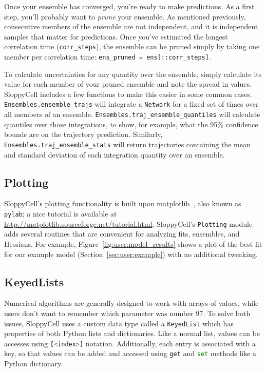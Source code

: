 \documentclass[12pt]{article}
\makeatletter
\newcommand{\py}[1]{\lstinline[language=Python, showstringspaces=False]@#1@}
\makeatother
\begin{document}
Once your ensemble has converged, you're ready to make predictions.
As a first step, you'll probably want to \emph{prune} your ensemble.
As mentioned previously, consecutive members of the ensemble are not independent, and it is independent samples that matter for predictions.
Once you've estimated the longest correlation time (\py{corr_steps}), the ensemble can be pruned simply by taking one member per correlation time: \py{ens_pruned = ens[::corr_steps]}.

To calculate uncertainties for any quantity over the ensemble, simply calculate its value for each member of your pruned ensemble and note the spread in values.
SloppyCell includes a few functions to make this easier in some common cases.
\py{Ensembles.ensemble_trajs} will integrate a \py{Network} for a fixed set of times over all members of an ensemble.
\py{Ensembles.traj_ensemble_quantiles} will calculate quantiles over those integrations, to show, for example, what the 95\% confidence bounds are on the trajectory prediction.
Similarly, \py{Ensembles.traj_ensemble_stats} will return trajectories containing the mean and standard deviation of each integration quantity over an ensemble.

\subsection{Plotting}

SloppyCell's plotting functionality is built upon matplotlib~\cite{bib:Hunter2007}, also known as \py{pylab}; a nice tutorial is available at \url{http://matplotlib.sourceforge.net/tutorial.html}.
SloppyCell's \py{Plotting} module adds several routines that are convenient for analyzing fits, ensembles, and Hessians.
For example, Figure~\ref{fig:user:model_results} shows a plot of the best fit for our example model (Section~\ref{sec:user:example}) with no additional tweaking.

\subsection{KeyedLists}
Numerical algorithms are generally designed to work with arrays of values, while users don't want to remember which parameter was number 97.
To solve both issues, SloppyCell uses a custom data type called a \py{KeyedList} which has properties of both Python lists and dictionaries.
Like a normal list, values can be accesses using \py{[<index>]} notation.
Additionally, each entry is associated with a key, so that values can be added and accessed using \py{get} and \py{set} methods like a Python dictionary.
\end{document}
